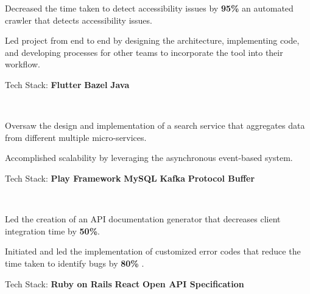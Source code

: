 \documentclass[]{Klement_Resume}
\begin{document}
\begin{minipage}[t]{1\textwidth}
    \begin{tightemize}
    \item Decreased the time taken to detect accessibility issues by {\bf 95\%} an automated crawler that detects accessibility issues.
    \item Led project from end to end by designing the architecture, implementing code, and developing processes for other teams to incorporate the tool into their workflow.
    \item Tech Stack: {\bf Flutter} \textbullet{} {\bf Bazel} \textbullet{} {\bf Java}
    \end{tightemize}
    \sectionsep


     \\
    \begin{tightemize}
    \item Oversaw the design and implementation of a search service that aggregates data from different multiple micro-services.
    \item Accomplished scalability by leveraging the asynchronous event-based system.
    \item Tech Stack: {\bf Play Framework} \textbullet{} {\bf MySQL} \textbullet{} {\bf Kafka} \textbullet{} {\bf Protocol Buffer} 
    \end{tightemize}
    \sectionsep

     \\
    \begin{tightemize}
    \item 
      Led the creation of an API documentation generator that decreases client integration time by {\bf50\%}. 
    \item
      Initiated and led the implementation of customized error codes that reduce the time taken to identify bugs by { \bf 80\% }.
    \item Tech Stack: {\bf Ruby on Rails} \textbullet{} {\bf React} \textbullet{} {\bf Open API Specification}
    \end{tightemize}
    \sectionsep


\end{minipage}
\end{document}
